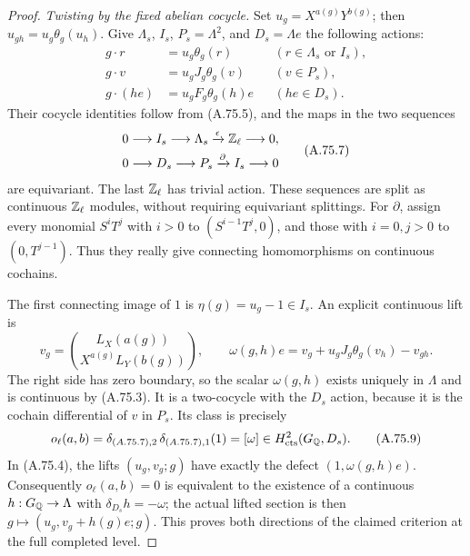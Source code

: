 \begin{proof}
\emph{Twisting by the fixed abelian cocycle.}
Set $u_g=X^{a(g)}Y^{b(g)}$; then
$u_{gh}=u_g\theta_g(u_h)$.
Give $\Lambda_s$, $I_s$, $P_s=\Lambda^2$, and
$D_s=\Lambda e$ the following actions:
\[
 \begin{aligned}
 g\cdot r&=u_g\theta_g(r)
                       &&(r\in\Lambda_s\text{ or }I_s),\\
 g\cdot v&=u_gJ_g\theta_g(v)
                       &&(v\in P_s),\\
 g\cdot(h e)&=u_gF_g\theta_g(h)e
                       &&(he\in D_s).
 \end{aligned}
 \tag{A.75.6}
\]
Their cocycle identities follow from (A.75.5), and the maps in
the two sequences
\[
 \begin{gathered}
 0\longrightarrow I_s\longrightarrow\Lambda_s
       \xrightarrow{\epsilon}\mathbb Z_\ell\longrightarrow0,\\
 0\longrightarrow D_s\longrightarrow P_s
       \xrightarrow{\partial}I_s\longrightarrow0
 \end{gathered}
 \tag{A.75.7}
\]
are equivariant.  The last $\mathbb Z_\ell$ has trivial action.
These sequences are split as continuous $\mathbb Z_\ell$ modules,
without requiring equivariant splittings.
For $\partial$, assign every monomial $S^iT^j$ with $i>0$
to $(S^{i-1}T^j,0)$, and those with $i=0,j>0$ to
$(0,T^{j-1})$.
Thus they really give connecting homomorphisms on continuous
cochains.

The first connecting image of $1$ is
$\eta(g)=u_g-1\in I_s$.
An explicit continuous lift is
\[
 v_g=\binom{L_X(a(g))}{X^{a(g)}L_Y(b(g))},\qquad
 \omega(g,h)e
       =v_g+u_gJ_g\theta_g(v_h)-v_{gh}.
 \tag{A.75.8}
\]
The right side has zero boundary, so the scalar $\omega(g,h)$
exists uniquely in $\Lambda$ and is continuous by (A.75.3).
It is a two-cocycle with the $D_s$ action, because it is the
cochain differential of $v$ in $P_s$.
Its class is precisely
\[
 o_\ell(a,b)=
 \delta_{(A.75.7),2}\,
 \delta_{(A.75.7),1}(1)
           =[\omega]\in H^2_{\rm cts}(G_\mathbb Q,D_s).
 \tag{A.75.9}
\]
In (A.75.4), the lifts $(u_g,v_g;g)$ have exactly the defect
$(1,\omega(g,h)e)$.
Consequently $o_\ell(a,b)=0$ is equivalent to the existence of
a continuous $h:G_\mathbb Q\to\Lambda$ with
$\delta_{D_s}h=-\omega$; the actual lifted section is then
$g\mapsto(u_g,v_g+h(g)e;g)$.
This proves both directions of the claimed criterion at the
full completed level.


\end{proof}
